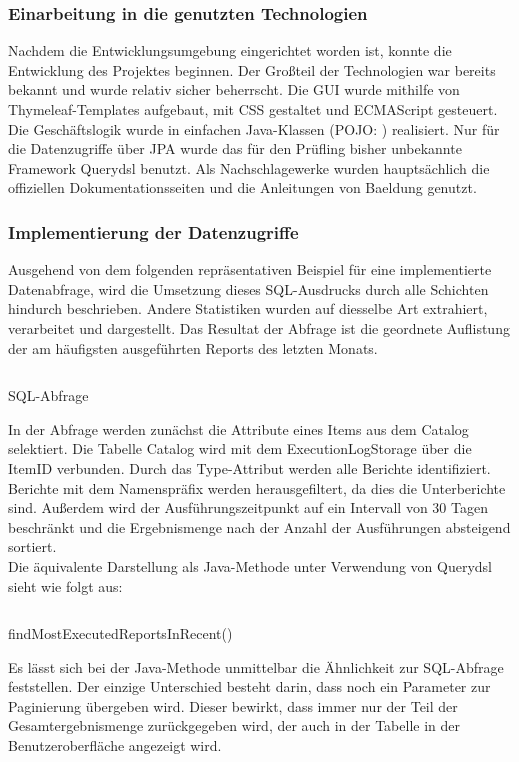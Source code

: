 \subsubsection{Einarbeitung in die genutzten Technologien}
\label{sec:Technologien}
Nachdem die Entwicklungsumgebung eingerichtet worden ist, konnte die Entwicklung des Projektes beginnen. Der Großteil der Technologien war bereits bekannt und wurde relativ sicher beherrscht. Die \ac{GUI} wurde mithilfe von Thymeleaf-Templates aufgebaut, mit CSS gestaltet und ECMAScript gesteuert. Die Geschäftslogik wurde in einfachen Java-Klassen (\acs{POJO}: ) realisiert. Nur für die Datenzugriffe über \ac{JPA} wurde das für den Prüfling bisher unbekannte Framework Querydsl benutzt. Als Nachschlagewerke wurden hauptsächlich die offiziellen Dokumentationsseiten und die Anleitungen von Baeldung genutzt.

\subsubsection{Implementierung der Datenzugriffe}
\label{sec:ImplementierungDatenzugriffe}
Ausgehend von dem folgenden repräsentativen Beispiel für eine implementierte Datenabfrage, wird die Umsetzung dieses SQL-Ausdrucks durch alle Schichten hindurch beschrieben. Andere Statistiken wurden auf diesselbe Art extrahiert, verarbeitet und dargestellt. Das Resultat der Abfrage ist die geordnete Auflistung der am häufigsten ausgeführten Reports des letzten Monats.
\begin{listing}[!ht]
  \inputminted{tsql}{Listings/most_used_reports.sql}
  \caption{SQL-Abfrage}
  \label{l:sql}
\end{listing}

In der Abfrage werden zunächst die Attribute eines Items aus dem Catalog selektiert. Die Tabelle Catalog wird mit dem ExecutionLogStorage über die ItemID verbunden. Durch das Type-Attribut werden alle Berichte identifiziert. Berichte mit dem Namenspräfix  werden herausgefiltert, da dies die Unterberichte sind. Außerdem wird der Ausführungszeitpunkt auf ein Intervall von 30 Tagen beschränkt und die Ergebnismenge nach der Anzahl der Ausführungen absteigend sortiert.\\
Die äquivalente Darstellung als Java-Methode unter Verwendung von Querydsl sieht wie folgt aus:
\clearpage
\begin{listing}[!ht]
  \inputminted{java}{Listings/findMostExecutedReportsInRecent().java}
  \caption{findMostExecutedReportsInRecent()}
  \label{l:findMostExecutedReportsInRecent}
\end{listing}
Es lässt sich bei der Java-Methode unmittelbar die Ähnlichkeit zur SQL-Abfrage feststellen. Der einzige Unterschied besteht darin, dass noch ein Parameter zur Paginierung übergeben wird. Dieser bewirkt, dass immer nur der Teil der Gesamtergebnismenge zurückgegeben wird, der auch in der Tabelle in der Benutzeroberfläche angezeigt wird.

